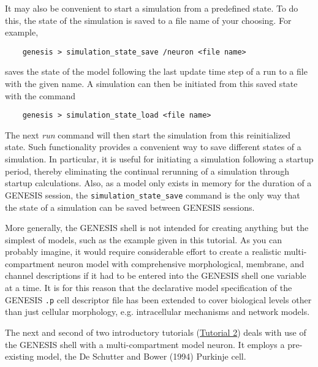\documentclass[12pt]{article}
\begin{document}
It may also be convenient to start a simulation from a predefined state. To do this, the state of the simulation is saved to a file name of your choosing. For example,
\begin{verbatim}
    genesis > simulation_state_save /neuron <file name>
\end{verbatim}
saves the state of the model following the last update time step of a run to a file with the given name. A simulation can then be initiated from this saved state with the command 
\begin{verbatim}
    genesis > simulation_state_load <file name>
\end{verbatim}
The next {\it run} command will then start the simulation from this reinitialized state. Such functionality provides a convenient way to save different states of a simulation. In particular, it is useful for initiating a simulation following a startup period, thereby eliminating the continual rerunning of a simulation through startup calculations. Also, as a model only exists in memory for the duration of a GENESIS session, the {\tt simulation\_state\_save} command  is the only way that the state of a simulation can be saved between GENESIS sessions.

More generally, the GENESIS shell is not intended for creating anything but the simplest of models, such as the example given in this tutorial.  As you can probably imagine, it would require considerable effort to create a realistic multi-compartment neuron model with comprehensive morphological, membrane, and channel descriptions if it had to be entered into the GENESIS shell one variable at a time. It is for this reason that the declarative model specification of the GENESIS {\tt.p} cell descriptor file has been extended to cover biological levels other than just cellular morphology, e.g. intracellular mechanisms and network models.

The next and second of two introductory tutorials (\href{../tutorial2/tutorial2.tex}{Tutorial 2}) deals with use of the GENESIS shell with a multi-compartment model neuron. It employs a pre-existing model, the De Schutter and Bower (1994) Purkinje cell.

\end{document}
